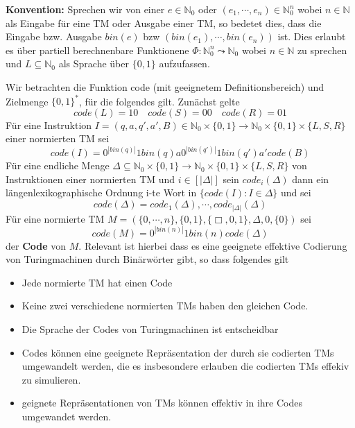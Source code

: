 \textbf{Konvention: } Sprechen wir von einer \(e \in \mathbb{N}_0\) oder \((e_1, \cdots, e_n) \in \mathbb{N}_0^n\) wobei \(n \in \mathbb{N}\) als Eingabe für eine TM oder Ausgabe einer TM, so bedetet dies, dass die Eingabe bzw. Ausgabe \(bin(e)\) bzw \((bin(e_1), \cdots, bin(e_n))\) ist. Dies erlaubt es über partiell berechnenbare Funktionene \(\Phi: \mathbb{N}_0^n \leadsto \mathbb{N}_0\) wobei \(n\in \mathbb{N}\) zu sprechen und \(L \subseteq \mathbb{N}_0\) als Sprache über \(\{0, 1\}\) aufzufassen.

  Wir betrachten die Funktion code (mit geeignetem Definitionsbereich) und Zielmenge \(\{0, 1\}^*\), für die folgendes gilt. Zunächst gelte 
  \[
    code(L) = 10 \quad code (S) = 00 \quad code(R) = 01
  \]
  Für eine Instruktion \( I = (q, a, q', a', B) \in \mathbb{N}_0 \times \{0, 1\} \to \mathbb{N}_0 \times \{0, 1\} \times \{L, S, R\}\) einer normierten TM sei \[code (I) = 0^{|bin(q)|} 1 bin (q) a 0^{|bin(q')|} 1 bin (q') a' code (B)\] Für eine endliche Menge \( \Delta \subseteq \mathbb{N}_0 \times \{0, 1\} \to \mathbb{N}_0 \times \{0, 1\}\times \{L, S, R\}\) von Instruktionen einer normierten TM und \(i \in [|\Delta|]\) sein \(code_i(\Delta)\) dann ein längenlexikographische Ordnung i-te Wort in \(\{code(I): I \in \Delta\}\) und sei 
  \[
    code (\Delta) = code_1(\Delta), \cdots, code_{|\Delta|}(\Delta)
  \]
  Für eine normierte TM \(M = (\{0, \cdots, n\}, \{0, 1\}, \{\Box, 0, 1\}, \Delta, 0, \{0\})\) sei 
  \[
    code (M) = 0^{|bin(n)|} 1 bin (n) code (\Delta)
  \]
  der \textbf{Code} von \(M\). Relevant ist hierbei dass es eine geeignete effektive Codierung von Turingmachinen durch Binärwörter gibt, so dass folgendes gilt 
  \begin{itemize}
    \item Jede normierte TM hat einen Code 
    \item Keine zwei verschiedene normierten TMs haben den gleichen Code.
    \item Die Sprache der Codes von Turingmachinen ist entscheidbar
    \item Codes können eine geeignete Repräsentation der durch sie codierten TMs umgewandelt werden, die es insbesondere erlauben die codierten TMs effekiv zu simulieren.
    \item geignete Repräsentationen von TMs können effektiv in ihre Codes umgewandet werden.
  \end{itemize}

